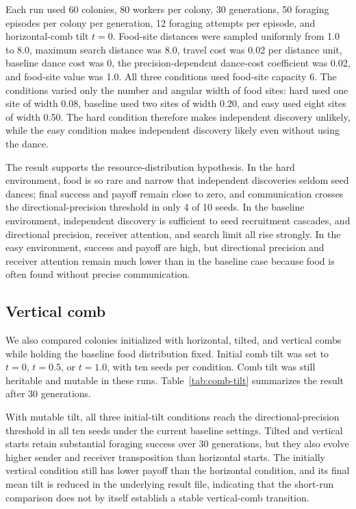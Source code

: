 \documentclass[11pt]{article}
\begin{document}
Each run used 60 colonies, 80 workers per colony, 30 generations, 50 foraging
episodes per colony per generation, 12 foraging attempts per episode, and
horizontal-comb tilt $t=0$. Food-site distances were sampled uniformly from
1.0 to 8.0, maximum search distance was 8.0, travel cost was 0.02 per distance
unit, baseline dance cost was 0, the precision-dependent dance-cost coefficient
was 0.02, and food-site value was 1.0. All three conditions used food-site
capacity 6. The conditions varied only the number and angular width of food
sites: hard used one site of width 0.08, baseline used two sites of width 0.20,
and easy used eight sites of width 0.50. The hard condition therefore makes
independent discovery unlikely, while the easy condition makes independent
discovery likely even without using the dance.



The result supports the resource-distribution hypothesis. In the hard
environment, food is so rare and narrow that independent discoveries seldom
seed dances; final success and payoff remain close to zero, and communication
crosses the directional-precision threshold in only 4 of 10 seeds. In the
baseline environment, independent discovery is sufficient to seed recruitment
cascades, and directional precision, receiver attention, and search limit all
rise strongly. In the easy environment, success and payoff are high, but
directional precision and receiver attention remain much lower than in the
baseline case because food is often found without precise communication.

\subsection{Vertical comb}

We also compared colonies initialized with horizontal, tilted, and vertical
combs while holding the baseline food distribution fixed. Initial comb tilt was
set to $t=0$, $t=0.5$, or $t=1.0$, with ten seeds per condition. Comb tilt was
still heritable and mutable in these runs. Table~\ref{tab:comb-tilt} summarizes
the result after 30 generations.



With mutable tilt, all three initial-tilt conditions reach the
directional-precision threshold in all ten seeds under the current baseline
settings. Tilted and vertical starts retain substantial foraging success over
30 generations, but they also evolve higher sender and receiver transposition
than horizontal starts. The initially vertical condition still has lower payoff
than the horizontal condition, and its final mean tilt is reduced in the
underlying result file, indicating that the short-run comparison does not by
itself establish a stable vertical-comb transition.
\end{document}
